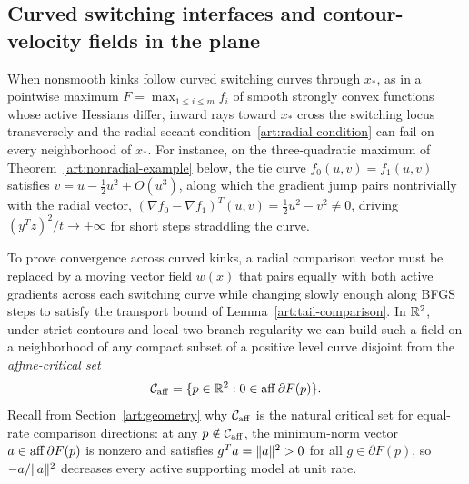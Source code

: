 \subsection{Curved switching interfaces and contour-velocity fields in the plane}

When nonsmooth kinks follow curved switching curves through $x_*$, as in a
pointwise maximum $F=\max_{1\le i\le m}f_i$ of smooth strongly convex functions
whose active Hessians differ, inward rays toward $x_*$ cross the switching
locus transversely and the radial secant condition~\eqref{art:radial-condition}
can fail on every neighborhood of $x_*$. For instance, on the three-quadratic
maximum of Theorem~\ref{art:nonradial-example} below, the tie curve
$f_0(u,v)=f_1(u,v)$ satisfies $v=u-\tfrac12u^2+O(u^3)$, along which the gradient
jump pairs nontrivially with the radial vector,
$(\nabla f_0-\nabla f_1)^T(u,v)=\tfrac12u^2-v^2\ne0$, driving
$(y^Tz)^2/t\to+\infty$ for short steps straddling the curve.

To prove convergence across curved kinks, a radial comparison vector must be
replaced by a moving vector field $w(x)$ that pairs equally with both active
gradients across each switching curve while changing slowly enough along BFGS
steps to satisfy the transport bound of Lemma~\ref{art:tail-comparison}. In $\mathbb R^2$, under strict contours and local two-branch regularity we can build
such a field on a neighborhood of any compact subset of a positive level curve
disjoint from the \emph{affine-critical set}
\[
 \mathcal C_{\rm aff}=\{p\in\mathbb R^2:0\in\operatorname{aff}\partial F(p)\}.
\]
Recall from Section~\ref{art:geometry} why $\mathcal C_{\rm aff}$ is the natural
critical set for equal-rate comparison directions: at any $p\notin\mathcal C_{\rm aff}$,
the minimum-norm vector $a\in\operatorname{aff}\partial F(p)$ is nonzero and satisfies
$g^Ta=\lVert a\rVert^2>0$ for all $g\in\partial F(p)$, so $-a/\lVert a\rVert^2$ decreases
every active supporting model at unit rate.

